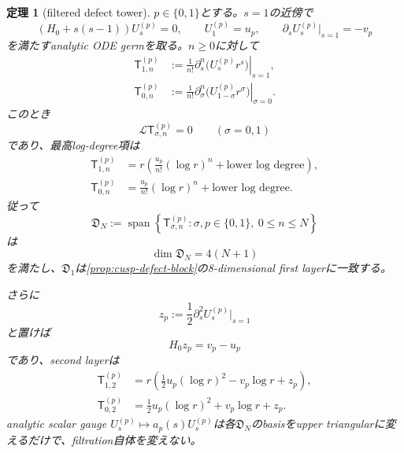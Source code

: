 \documentclass[11pt,a4paper]{ltjsarticle}
\newtheorem{theorem}{定理}[section]
\theoremstyle{definition}
\theoremstyle{remark}
\begin{document}
\begin{theorem}[filtered defect tower]\label{thm:filtered-defect-tower}
$p\in\{0,1\}$とする。$s=1$の近傍で
\begin{equation}\label{eq:filtered-longitudinal-family}
 (H_0+s(s-1))U_s^{(p)}=0,
 \qquad
 U_1^{(p)}=u_p,
 \qquad
 \partial_sU_s^{(p)}|_{s=1}=-v_p
\end{equation}
を満たすanalytic ODE germを取る。$n\ge0$に対して
\begin{align}
 \mathsf T_{1,n}^{(p)}
 &:=\frac1{n!}
   \left.\partial_s^n\bigl(U_s^{(p)}r^s\bigr)\right|_{s=1},
 \label{eq:root-one-filtered-tower}\\
 \mathsf T_{0,n}^{(p)}
 &:=\frac1{n!}
   \left.\partial_\sigma^n
   \bigl(U_{1-\sigma}^{(p)}r^\sigma\bigr)
   \right|_{\sigma=0}.
 \label{eq:root-zero-filtered-tower}
\end{align}
このとき
\begin{equation}\label{eq:filtered-tower-kernel}
 \mathscr L\mathsf T_{\sigma,n}^{(p)}=0
 \qquad(\sigma=0,1)
\end{equation}
であり、最高log-degree項は
\begin{align}
 \mathsf T_{1,n}^{(p)}
 &=r\left(
   \frac{u_p}{n!}(\log r)^n
   +\text{lower log degree}
   \right),
 \label{eq:root-one-tower-leading}\\
 \mathsf T_{0,n}^{(p)}
 &=\frac{u_p}{n!}(\log r)^n
   +\text{lower log degree}.
 \label{eq:root-zero-tower-leading}
\end{align}
従って
\begin{equation}\label{eq:filtered-defect-space}
 \mathfrak D_N
 :=\operatorname{span}\left\{
 \mathsf T_{\sigma,n}^{(p)}:
 \sigma,p\in\{0,1\},\ 0\le n\le N
 \right\}
\end{equation}
は
\begin{equation}\label{eq:filtered-defect-dimension}
 \boxed{\dim\mathfrak D_N=4(N+1)}
\end{equation}
を満たし、$\mathfrak D_1$は\cref{prop:cusp-defect-block}の8-dimensional first layerに一致する。

さらに
\begin{equation}\label{eq:second-longitudinal-jordan}
 z_p:=\frac12\partial_s^2U_s^{(p)}|_{s=1}
\end{equation}
と置けば
\begin{equation}\label{eq:H0-zp}
 H_0z_p=v_p-u_p
\end{equation}
であり、second layerは
\begin{align}
 \mathsf T_{1,2}^{(p)}
 &=r\left(
 \frac12u_p(\log r)^2-v_p\log r+z_p
 \right),
 \label{eq:T12-explicit}\\
 \mathsf T_{0,2}^{(p)}
 &=\frac12u_p(\log r)^2+v_p\log r+z_p.
 \label{eq:T02-explicit}
\end{align}
analytic scalar gauge $U_s^{(p)}\mapsto a_p(s)U_s^{(p)}$は各$\mathfrak D_N$のbasisをupper triangularに変えるだけで、filtration自体を変えない。
\end{theorem}
\end{document}
